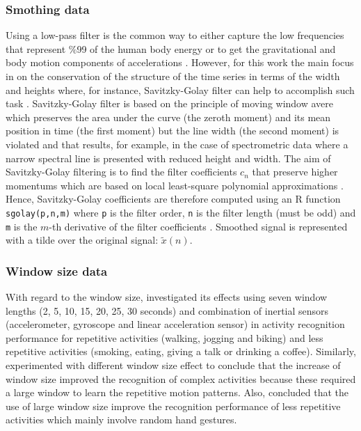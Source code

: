 \subsubsection{Smothing data}
Using a low-pass filter is the common way to either capture
the low frequencies that represent \%99 of the human body energy 
or to get the  gravitational  and body motion components of accelerations \cite{anguita2013}.
However, for this work the main focus in on the conservation of 
the structure of the time series in terms of the width and heights where, 
for instance, Savitzky-Golay filter can help to accomplish such task \cite{press1992}.
Savitzky-Golay filter is based on the principle of moving window avere  
which preserves the area under the curve (the zeroth moment)
and its mean position in time (the first moment) 
but the line width (the second moment) is violated 
and that results, for example, in the case of spectrometric data
where a narrow spectral line is presented with reduced height  
and width. 
The aim of Savitzky-Golay filtering is to find the filter 
coefficients $c_n$ that preserve higher momentums
which are based on local least-square polynomial approximations 
\cite{savitzkygolay1964, press1992, schafer2011}.
Hence, Savitzky-Golay coefficients are therefore computed using an R function 
\texttt{sgolay(p,n,m)} where \texttt{p} is the filter order, 
\texttt{n} is the filter length (must be odd) 
and \texttt{m} is the $m$-th derivative of the filter coefficients  \cite{Rsignal}.
Smoothed signal is represented with a tilde over the original signal: $\tilde{x}(n)$.



\subsubsection{Window size data}
With regard to the window size, \cite{shoaib2016} investigated its effects 
using seven window lengths (2, 5, 10, 15, 20, 25, 30 seconds)
and combination of inertial sensors (accelerometer, gyroscope and linear acceleration sensor)
in activity recognition performance for repetitive activities 
(walking, jogging and biking) and less repetitive activities 
(smoking, eating, giving a talk or drinking a coffee).
Similarly, \cite{shoaib2016} experimented with 
different window size effect to conclude that the increase of window size 
improved the recognition of complex activities because these required 
a large window to learn the repetitive motion patterns.
Also, \cite{shoaib2016} concluded that the use of large window size 
improve the recognition performance of less repetitive activities which mainly 
involve random hand gestures.

